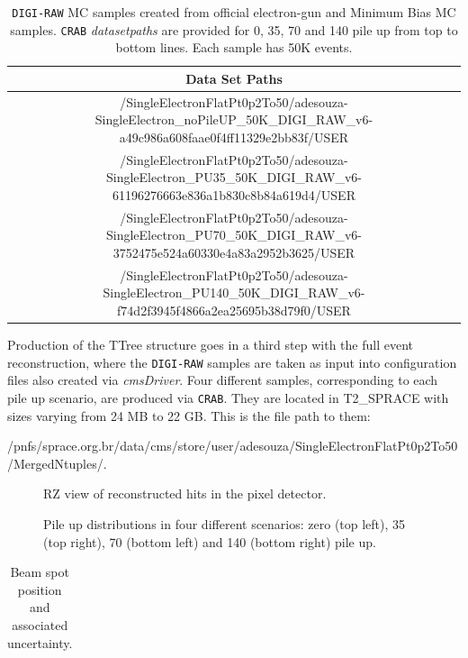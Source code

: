 \begin{table}[!htb]
  \centering
  \scriptsize
  \caption{\texttt{DIGI-RAW} MC samples created from official electron-gun and Minimum Bias MC samples.
    \texttt{CRAB} {\it datasetpaths} are provided for 0, 35, 70 and 140 pile up from top to bottom lines.
    Each sample has 50K events.}
  \label{tab:digi-raw}
  \begin{tabular}{c}
    \hline
        {\bf Data Set Paths} \\ \hline \hline
        /SingleElectronFlatPt0p2To50/adesouza-SingleElectron\_noPileUP\_50K\_DIGI\_RAW\_v6-a49c986a608faae0f4ff11329e2bb83f/USER \\
        /SingleElectronFlatPt0p2To50/adesouza-SingleElectron\_PU35\_50K\_DIGI\_RAW\_v6-61196276663e836a1b830c8b84a619d4/USER \\
        /SingleElectronFlatPt0p2To50/adesouza-SingleElectron\_PU70\_50K\_DIGI\_RAW\_v6-3752475e524a60330e4a83a2952b3625/USER \\
        /SingleElectronFlatPt0p2To50/adesouza-SingleElectron\_PU140\_50K\_DIGI\_RAW\_v6-f74d2f3945f4866a2ea25695b38d79f0/USER \\ \hline
  \end{tabular}
\end{table}

Production of the TTree structure goes in a third step with the full event reconstruction, where the
\texttt{DIGI-RAW} samples are taken as input into configuration files also created via {\it cmsDriver}.
Four different samples, corresponding to each pile up scenario, are produced via \texttt{CRAB}. They are
located in T2\_SPRACE with sizes varying from 24 MB to 22 GB. This is the file path to them:

{\footnotesize /pnfs/sprace.org.br/data/cms/store/user/adesouza/SingleElectronFlatPt0p2To50/MergedNtuples/}.

\begin{figure}[!htb]
  \centering
  \caption{RZ view of reconstructed hits in the pixel detector.}
  \label{}
\end{figure}

\begin{figure}[!htb]
  \centering
  \caption{Pile up distributions in four different scenarios: zero (top left), 35 (top right), 70 (bottom
    left) and 140 (bottom right) pile up.}
  \label{}
\end{figure}

\begin{table}[!htb]
  \centering
  \caption{Beam spot position and associated uncertainty.}
  \label{}
  \begin{tabular}{ccc}
  \end{tabular}
\end{table}


